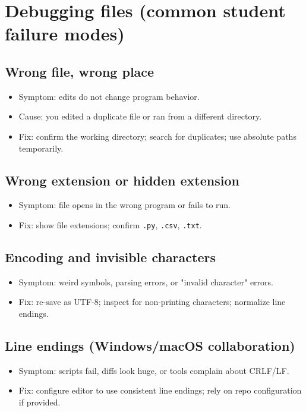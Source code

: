 \section{Debugging files (common student failure modes)}
\subsection{Wrong file, wrong place}
\begin{itemize}
\item Symptom: edits do not change program behavior.
\item Cause: you edited a duplicate file or ran from a different directory.
\item Fix: confirm the working directory; search for duplicates; use absolute paths temporarily.
\end{itemize}

\subsection{Wrong extension or hidden extension}
\begin{itemize}
\item Symptom: file opens in the wrong program or fails to run.
\item Fix: show file extensions; confirm \texttt{.py}, \texttt{.csv}, \texttt{.txt}.
\end{itemize}

\subsection{Encoding and invisible characters}
\begin{itemize}
\item Symptom: weird symbols, parsing errors, or "invalid character" errors.
\item Fix: re-save as UTF-8; inspect for non-printing characters; normalize line endings.
\end{itemize}

\subsection{Line endings (Windows/macOS collaboration)}
\begin{itemize}
\item Symptom: scripts fail, diffs look huge, or tools complain about CRLF/LF.
\item Fix: configure editor to use consistent line endings; rely on repo configuration if provided.
\end{itemize}

